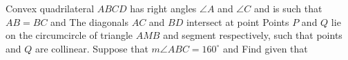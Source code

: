 Convex quadrilateral $ABCD$ has right angles $\angle A$ and $\angle C$ and is such that $AB=BC$ and   The diagonals $AC$ and $BD$ intersect at point   Points $P$ and $Q$ lie on the circumcircle of triangle $AMB$ and segment  respectively, such that points   and $Q$ are collinear.  Suppose that $m\angle ABC=160^\circ$ and   Find  given that 